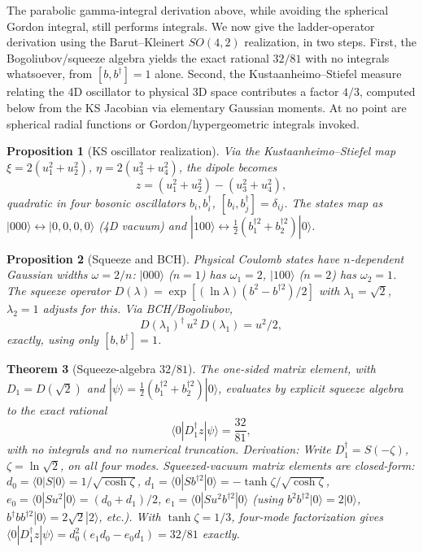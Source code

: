 \documentclass[11pt]{amsart}
\newtheorem{theorem}{Theorem}[section]
\newtheorem{proposition}[theorem]{Proposition}
\theoremstyle{remark}
\begin{document}
The parabolic gamma-integral derivation above, while avoiding the
spherical Gordon integral, still performs integrals.  We now give the
ladder-operator derivation using the Barut--Kleinert $SO(4,2)$
realization, in two steps.  First, the Bogoliubov/squeeze algebra
yields the exact rational $32/81$ with no integrals whatsoever, from
$[b,b^\dagger]=1$ alone.  Second, the Kustaanheimo--Stiefel measure
relating the 4D oscillator to physical 3D space contributes a factor
$4/3$, computed below from the KS Jacobian via elementary Gaussian
moments.  At no point are spherical radial functions or
Gordon/hypergeometric integrals invoked.

\begin{proposition}[KS oscillator realization]
Via the Kustaanheimo--Stiefel map
$\xi=2(u_1^2+u_2^2)$, $\eta=2(u_3^2+u_4^2)$, the dipole becomes
\begin{equation}
z = (u_1^2+u_2^2)-(u_3^2+u_4^2),
\end{equation}
quadratic in four bosonic oscillators $b_i,b_i^\dagger$,
$[b_i,b_j^\dagger]=\delta_{ij}$.  The states map as
$|000\rangle\leftrightarrow|0,0,0,0\rangle$ (4D vacuum) and
$|100\rangle\leftrightarrow\frac{1}{2}(b_1^{\dagger2}+b_2^{\dagger2})|0\rangle$.
\end{proposition}

\begin{proposition}[Squeeze and BCH]
Physical Coulomb states have $n$-dependent Gaussian widths
$\omega=2/n$: $|000\rangle$ ($n=1$) has $\omega_1=2$,
$|100\rangle$ ($n=2$) has $\omega_2=1$.  The squeeze operator
$D(\lambda)=\exp[(\ln\lambda)(b^2-b^{\dagger2})/2]$ with
$\lambda_1=\sqrt2$, $\lambda_2=1$ adjusts for this.  Via BCH/Bogoliubov,
\begin{equation}
D(\lambda_1)^\dagger\, u^2\, D(\lambda_1) = u^2/2,
\end{equation}
exactly, using only $[b,b^\dagger]=1$.
\end{proposition}

\begin{theorem}[Squeeze-algebra $32/81$]
The one-sided matrix element, with $D_1=D(\sqrt2)$ and
$|\psi\rangle=\frac12(b_1^{\dagger2}+b_2^{\dagger2})|0\rangle$,
evaluates by explicit squeeze algebra to the exact rational
\begin{equation}
\langle0|D_1^\dagger z|\psi\rangle = \frac{32}{81},
\end{equation}
with no integrals and no numerical truncation.
\emph{Derivation:} Write $D_1^\dagger=S(-\zeta)$, $\zeta=\ln\sqrt2$,
on all four modes.  Squeezed-vacuum matrix elements are closed-form:
$d_0=\langle0|S|0\rangle=1/\sqrt{\cosh\zeta}$,
$d_1=\langle0|Sb^{\dagger2}|0\rangle=-\tanh\zeta/\sqrt{\cosh\zeta}$,
$e_0=\langle0|Su^2|0\rangle=(d_0+d_1)/2$,
$e_1=\langle0|Su^2b^{\dagger2}|0\rangle$
(using $b^2b^{\dagger2}|0\rangle=2|0\rangle$,
$b^\dagger bb^{\dagger2}|0\rangle=2\sqrt2|2\rangle$, etc.).
With $\tanh\zeta=1/3$, four-mode factorization gives
$\langle0|D_1^\dagger z|\psi\rangle
=d_0^2(e_1d_0-e_0d_1)=32/81$ exactly.
\end{theorem}
\end{document}
